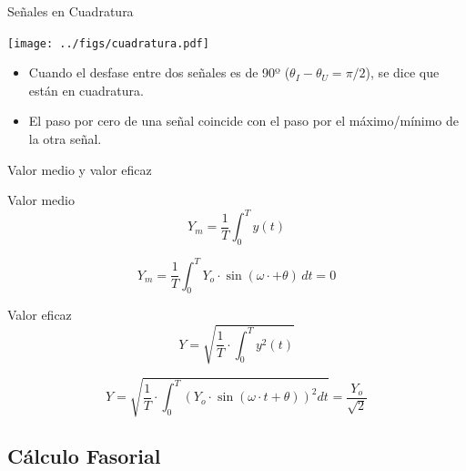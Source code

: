 \documentclass[xcolor={usenames,svgnames,dvipsnames}]{beamer}
\begin{document}
\begin{frame}[label={sec:org3619916}]{Señales en Cuadratura}
\begin{center}
\texttt{[image: ../figs/cuadratura.pdf]}
\end{center}

\begin{itemize}
\item Cuando el desfase entre dos señales es de 90º (\(\theta_I - \theta_U = \pi/2\)), se dice que están en cuadratura.
\item El paso por cero de una señal coincide con el paso por el máximo/mínimo de la otra señal.
\end{itemize}
\end{frame}


\begin{frame}[label={sec:orgc2070eb}]{Valor medio y valor eficaz}
\begin{block}{Valor medio}
\[
Y_m=\frac{1}{T}\int_{0}^{T}y(t)
\]

\[
Y_m=\frac{1}{T}\int_{0}^{T}Y_{o}\cdot\sin(\omega\cdot+\theta)\, dt=0
\]
\end{block}
\begin{block}{Valor eficaz}
\[
Y = \sqrt{\frac{1}{T}\cdot\int_{0}^{T}y^{2}(t)}
\]

\[
Y=\sqrt{\frac{1}{T}\cdot\int_{0}^{T}\left(Y_{o}\cdot\sin(\omega\cdot t+\theta)\right)^{2}dt}=\boxed{\frac{Y_{o}}{\sqrt{2}}}
\]
\end{block}
\end{frame}
\subsection{Cálculo Fasorial}
\label{sec:org3bb5219}
\end{document}

